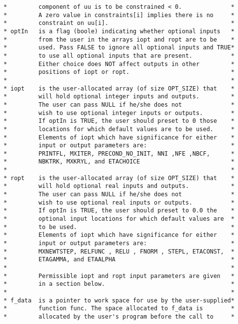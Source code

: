 \begin{verbatim}
 *         component of uu is to be constrained < 0.              *
 *         A zero value in constraints[i] implies there is no     *
 *         constraint on uu[i].                                   *
 * optIn   is a flag (boole) indicating whether optional inputs   *
 *         from the user in the arrays iopt and ropt are to be    *
 *         used. Pass FALSE to ignore all optional inputs and TRUE*
 *         to use all optional inputs that are present.           *
 *         Either choice does NOT affect outputs in other         *
 *         positions of iopt or ropt.                             *
 *                                                                *
 * iopt    is the user-allocated array (of size OPT_SIZE) that    *
 *         will hold optional integer inputs and outputs.         *
 *         The user can pass NULL if he/she does not              *
 *         wish to use optional integer inputs or outputs.        *
 *         If optIn is TRUE, the user should preset to 0 those    *
 *         locations for which default values are to be used.     *
 *         Elements of iopt which have significance for either    *
 *         input or output parameters are:                        *
 *         PRINTFL, MXITER, PRECOND_NO_INIT, NNI ,NFE ,NBCF,      *
 *         NBKTRK, MXKRYL, and ETACHOICE                          *
 *                                                                *
 * ropt    is the user-allocated array (of size OPT_SIZE) that    *
 *         will hold optional real inputs and outputs.            *
 *         The user can pass NULL if he/she does not              *
 *         wish to use optional real inputs or outputs.           *
 *         If optIn is TRUE, the user should preset to 0.0 the    *
 *         optional input locations for which default values are  *
 *         to be used.                                            *
 *         Elements of iopt which have significance for either    *
 *         input or output parameters are:                        *
 *         MXNEWTSTEP, RELFUNC , RELU , FNORM , STEPL, ETACONST,  *
 *         ETAGAMMA, and ETAALPHA                                 * 
 *                                                                *
 *         Permissible iopt and ropt input parameters are given   *
 *         in a section below.                                    *
 *                                                                *
 * f_data  is a pointer to work space for use by the user-supplied*
 *         function func. The space allocated to f_data is        *
 *         allocated by the user's program before the call to     *

\end{verbatim}
